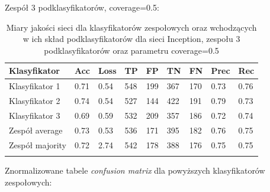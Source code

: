 \documentclass[polish,12pt]{aghthesis}
\begin{document}
\noindent Zespół 3 podklasyfikatorów, coverage=0.5:
\renewcommand{\arraystretch}{1.75}
 \begin{longtable}[h!]{|m{2.6cm}|m{1.2cm}|m{1.2cm}|m{1.2cm}|m{1.2cm}|m{1.2cm}|m{1.2cm}|m{1.2cm}|m{1.2cm}|}
 \hline
 Klasyfikator & Acc & Loss & TP & FP & TN & FN & Prec & Rec\\
 \hline
 Klasyfikator 1 & 0.71 & 0.54 & 548 & 199 & 367 & 170 & 0.73 & 0.76\\
 \hline
 Klasyfikator 2 & 0.74 & 0.54 & 527 & 144 & 422 & 191 & 0.79 & 0.73\\
 \hline
 Klasyfikator 3 & 0.69 & 0.59 & 532 & 209 & 357 & 186 & 0.72 & 0.74\\
 \hline
 Zespół average & 0.73 & 0.53 & 536 & 171 & 395 & 182 & 0.76 & 0.75\\ 
 \hline
 Zespół \newline majority & 0.72 & 2.74 & 542 & 178 & 388 & 176 & 0.75 & 0.75\\
 \hline
\caption{Miary jakości sieci dla klasyfikatorów zespołowych oraz wchodzących w ich skład podklasyfikatorów dla sieci Inception, zespołu 3 podklasyfikatorów oraz parametru coverage=0.5}
\label{table:24}
\end{longtable}
\newpage
\noindent Znormalizowane tabele \textit{confusion matrix} dla powyższych klasyfikatorów zespołowych:
\end{document}
